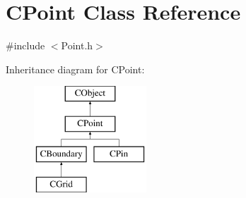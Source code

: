 \hypertarget{classCPoint}{}\section{C\+Point Class Reference}
\label{classCPoint}


{\ttfamily \#include $<$Point.\+h$>$}

Inheritance diagram for C\+Point\+:\begin{figure}[H]
\begin{center}
\leavevmode
\includegraphics[height=4.000000cm]{classCPoint}
\end{center}
\end{figure}
